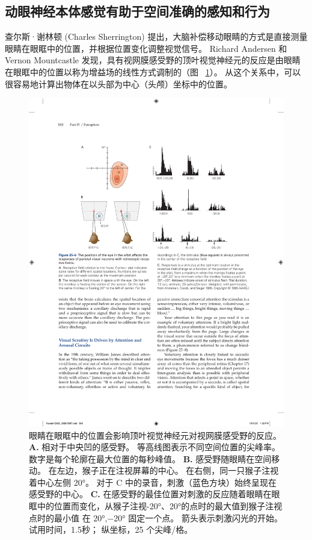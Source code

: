 \subsection{动眼神经本体感觉有助于空间准确的感知和行为}

查尔斯·谢林顿 (Charles Sherrington) 提出，大脑补偿移动眼睛的方式是直接测量眼睛在眼眶中的位置，并根据位置变化调整视觉信号。
Richard Andersen 和 Vernon Mountcastle 发现，具有视网膜感受野的顶叶视觉神经元的反应是由眼睛在眼眶中的位置以称为增益场的线性方式调制的（图 ~\ref{fig:25_6}）。
从这个关系中，可以很容易地计算出物体在以头部为中心（头颅）坐标中的位置。


\begin{figure}[htbp]
	\centering
	\includegraphics[width=0.7\linewidth]{chap25/fig_25_6}
	\caption{眼睛在眼眶中的位置会影响顶叶视觉神经元对视网膜感受野的反应。
		\textbf{A.} 相对于中央凹的感受野。 等高线图表示不同空间位置的尖峰率。
		数字是每个轮廓在最大位置的每秒峰值。
		\textbf{B.} 感受野随眼睛在空间移动。
		在左边，猴子正在注视屏幕的中心。
		在右侧，同一只猴子注视着中心左侧 20°。
		对于 C 中的录音，刺激（蓝色方块）始终呈现在感受野的中心。 
		\textbf{C.} 在感受野的最佳位置对刺激的反应随着眼睛在眼眶中的位置而变化，从猴子注视-20°、20°的点时的最大值到猴子注视点时的最小值 在 20°,−20° 固定一个点。
		箭头表示刺激闪光的开始。
		试用时间，1.5秒； 纵坐标，25 个尖峰/格\cite{andersen1985encoding}。}
	\label{fig:25_6}
\end{figure}


